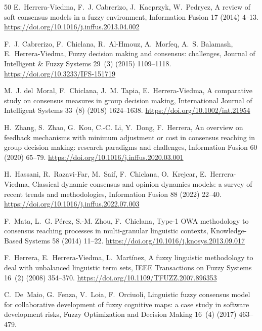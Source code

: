 \documentclass[preprint,11pt]{elsarticle}
\begin{document}
\begin{thebibliography}{50}
E.~Herrera-Viedma, F.~J. Cabrerizo, J.~Kacprzyk, W.~Pedrycz, A review
of soft consensus models in a fuzzy environment, Information Fusion 17
(2014) 4--13.
\url{https://doi.org/10.1016/j.inffus.2013.04.002}

F.~J. Cabrerizo, F.~Chiclana, R.~Al-Hmouz, A.~Morfeq, A.~S. Balamash,
E.~Herrera-Viedma, Fuzzy decision making and consensus: challenges,
Journal of Intelligent \& Fuzzy Systems 29~(3) (2015) 1109--1118.
\url{https://doi.org/10.3233/IFS-151719}

M.~J. del~Moral, F.~Chiclana, J.~M. Tapia, E.~Herrera-Viedma, A
comparative study on consensus measures in group decision making,
International Journal of Intelligent Systems 33~(8) (2018) 1624--1638.
\url{https://doi.org/10.1002/int.21954}

H.~Zhang, S.~Zhao, G.~Kou, C.-C. Li, Y.~Dong, F.~Herrera, An overview
on feedback mechanisms with minimum adjustment or cost in consensus
reaching in group decision making: research paradigms and challenges,
Information Fusion 60 (2020) 65--79.
\url{https://doi.org/10.1016/j.inffus.2020.03.001}

H.~Hassani, R.~Razavi-Far, M.~Saif, F.~Chiclana, O.~Krejcar,
E.~Herrera-Viedma, Classical dynamic consensus and opinion dynamics
models: a survey of recent trends and methodologies, Information Fusion
88 (2022) 22--40.
\url{https://doi.org/10.1016/j.inffus.2022.07.003}

F.~Mata, L.~G. P\'erez, S.-M. Zhou, F.~Chiclana, Type-1 OWA methodology
to consensus reaching processes in multi-granular linguistic contexts,
Knowledge-Based Systems 58 (2014) 11--22.
\url{https://doi.org/10.1016/j.knosys.2013.09.017}

F.~Herrera, E.~Herrera-Viedma, L.~Mart\'inez, A fuzzy linguistic
methodology to deal with unbalanced linguistic term sets, IEEE
Transactions on Fuzzy Systems 16~(2) (2008) 354--370.
\url{https://doi.org/10.1109/TFUZZ.2007.896353}

C.~De~Maio, G.~Fenza, V.~Loia, F.~Orciuoli, Linguistic fuzzy consensus
model for collaborative development of fuzzy cognitive maps: a case
study in software development risks, Fuzzy Optimization and Decision
Making 16~(4) (2017) 463--479.



\end{thebibliography}
\end{document}
